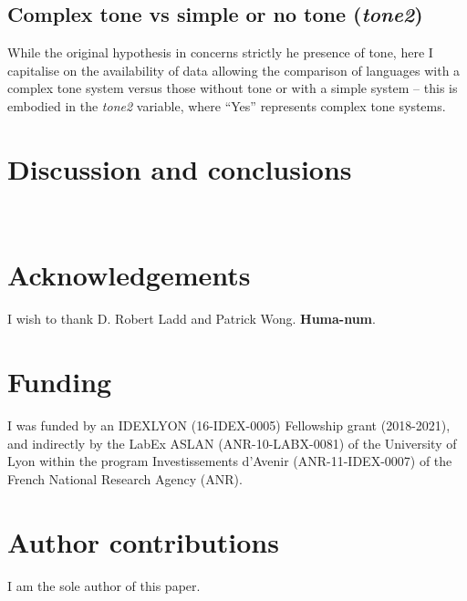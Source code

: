 \documentclass[twoside,twocolumn]{article}
\begin{document}
\subsection{Complex tone vs simple or no tone (\textit{tone2})}

While the original hypothesis in \citet{dediu_ladd_2007} concerns strictly he presence of tone, here I capitalise on the availability of data allowing the comparison of languages with a complex tone system versus those without tone or with a simple system -- this is embodied in the \textit{tone2} variable, where ``Yes'' represents complex tone systems.





\section{Discussion and conclusions}

\



\section*{Acknowledgements}

I wish to thank D. Robert Ladd and Patrick Wong. \textbf{Huma-num}.



\section*{Funding}

I was funded by an IDEXLYON (16-IDEX-0005) Fellowship grant (2018-2021), and indirectly by the LabEx ASLAN (ANR-10-LABX-0081) of the University of Lyon within the program Investissements d’Avenir (ANR-11-IDEX-0007) of the French National Research Agency (ANR).



\section*{Author contributions}

I am the sole author of this paper.


\end{document}
